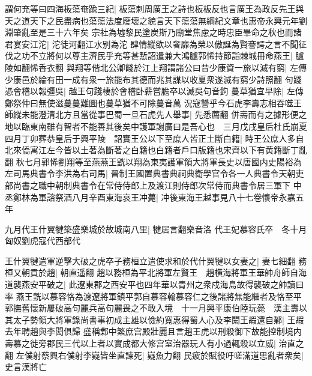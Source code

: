 謂何充等曰四海板蕩奄踰三紀|{
	板蕩刺周厲王之詩也板板反也言厲王為政反先王與天之道天下之民盡病也蕩蕩法度廢壞之貌言天下蕩蕩無綱紀文章也惠帝永興元年劉淵肇亂至是三十六年矣}
宗社為墟黎民塗炭斯乃廟堂焦慮之時忠臣畢命之秋也而諸君宴安江沱|{
	沱徒河翻江水别為沱}
肆情縱欲以奢靡為榮以傲誕為賢謇諤之言不聞征伐之功不立將何以尊主濟民乎充等甚慙詔遣兼大鴻臚郭悕持節詣棘城冊命燕王|{
	臚陵如翻悕香衣翻}
與翔等偕北公卿餞於江上翔謂諸公曰昔少康資一旅以滅有窮|{
	左傳少康邑於綸有田一成有衆一旅能布其德而兆其謀以收夏衆遂滅有窮少詩照翻}
句踐憑會稽以報彊吳|{
	越王句踐棲於會稽卧薪嘗膽卒以滅吳句音鉤}
蔓草猶宜早除|{
	左傳鄭祭仲曰無使滋蔓蔓難圖也蔓草猶不可除蔓音萬}
況寇讐乎今石虎李壽志相吞噬王師縱未能澄清北方且當從事巴蜀一旦石虎先人舉事|{
	先悉薦翻}
併壽而有之據形便之地以臨東南雖有智者不能善其後矣中護軍謝廣曰是吾心也　三月戊戌皇后杜氏崩夏四月丁卯葬恭皇后于興平陵　詔實王公以下至庶人皆正土斷白籍|{
	時王公庶人多自北來僑寓江左今皆以土著為斷著之白籍也白籍者戶口版籍也宋齊以下有黄籍斷丁亂翻}
秋七月郭悕劉翔等至燕燕王皝以翔為東夷護軍領大將軍長史以唐國内史陽裕為左司馬典書令李洪為右司馬|{
	晉制王國置典書典祠典衛學官令各一人典書令天朝吏部尚書之職中朝制典書令在常侍侍郎上及渡江則侍郎次常侍而典書令居三軍下}
中丞鄭林為軍諮祭酒八月辛酉東海哀王冲薨|{
	冲後東海王越事見八十七卷懷帝永嘉五年}


九月代王什翼犍築盛樂城於故城南八里|{
	犍居言翻樂音洛}
代王妃慕容氏卒　冬十月匈奴劉虎寇代西部代

王什翼犍遣軍逆擊大破之虎卒子務桓立遣使求和於代什翼犍以女妻之|{
	妻七細翻}
務桓又朝貢於趙|{
	朝直遥翻}
趙以務桓為平北將軍左賢王　趙横海將軍王華帥舟師自海道襲燕安平破之|{
	此遼東郡之西安平也四年華以青州之衆戍海島故得襲破之帥讀曰率}
燕王皝以慕容恪為渡遼將軍鎮平郭自慕容翰慕容仁之後諸將無能繼者及恪至平郭撫舊懷新屢破高句麗兵高句麗畏之不敢入境　十一月興平康伯陸玩薨　漢主壽以其太子勢領大將軍錄尚書事初成主雄以儉約寬惠得蜀人心及李閎王嘏還自鄴|{
	王嘏去年聘趙與李閎俱歸}
盛稱鄴中繁庶宫殿壯麗且言趙王虎以刑殺御下故能控制境内壽慕之徙旁郡民三代以上者以實成都大修宫室治器玩人有小過輒殺以立威|{
	治直之翻}
左僕射蔡興右僕射李嶷皆坐直諫死|{
	嶷魚力翻}
民疲於賦役吁嗟滿道思亂者衆矣|{
	史言漢將亡}


